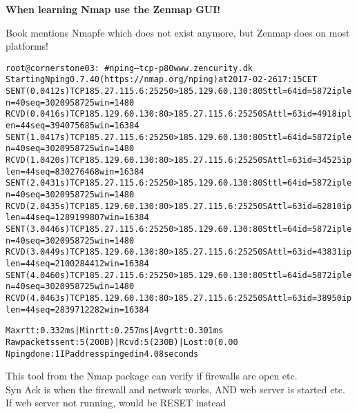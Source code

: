 \documentclass[Screen16to9,17pt]{foils}
\begin{document}
\centerline{\bf When learning Nmap use the Zenmap GUI!}

Book mentions Nmapfe which does not exist anymore, but Zenmap does on most platforms!

\begin{alltt}\footnotesize
root@cornerstone03:~# nping --tcp -p80 www.zencurity.dk
Starting Nping 0.7.40 ( https://nmap.org/nping ) at 2017-02-26 17:15 CET
SENT (0.0412s) TCP 185.27.115.6:25250 > 185.129.60.130:80 S ttl=64 id=5872 iplen=40  seq=3020958725 win=1480
RCVD (0.0416s) TCP 185.129.60.130:80 > 185.27.115.6:25250 SA ttl=63 id=4918 iplen=44  seq=394075685 win=16384
SENT (1.0417s) TCP 185.27.115.6:25250 > 185.129.60.130:80 S ttl=64 id=5872 iplen=40  seq=3020958725 win=1480
RCVD (1.0420s) TCP 185.129.60.130:80 > 185.27.115.6:25250 SA ttl=63 id=34525 iplen=44  seq=830276468 win=16384
SENT (2.0431s) TCP 185.27.115.6:25250 > 185.129.60.130:80 S ttl=64 id=5872 iplen=40  seq=3020958725 win=1480
RCVD (2.0435s) TCP 185.129.60.130:80 > 185.27.115.6:25250 SA ttl=63 id=62810 iplen=44  seq=1289199807 win=16384
SENT (3.0446s) TCP 185.27.115.6:25250 > 185.129.60.130:80 S ttl=64 id=5872 iplen=40  seq=3020958725 win=1480
RCVD (3.0449s) TCP 185.129.60.130:80 > 185.27.115.6:25250 SA ttl=63 id=43831 iplen=44  seq=2100284412 win=16384
SENT (4.0460s) TCP 185.27.115.6:25250 > 185.129.60.130:80 S ttl=64 id=5872 iplen=40  seq=3020958725 win=1480
RCVD (4.0463s) TCP 185.129.60.130:80 > 185.27.115.6:25250 SA ttl=63 id=38950 iplen=44  seq=2839712282 win=16384

Max rtt: 0.332ms | Min rtt: 0.257ms | Avg rtt: 0.301ms
Raw packets sent: 5 (200B) | Rcvd: 5 (230B) | Lost: 0 (0.00%)
Nping done: 1 IP address pinged in 4.08 seconds
\end{alltt}

This tool from the Nmap package can verify if firewalls are open etc. \\
Syn Ack is when the firewall and network works, AND web server is started etc.\\
If web server not running, would be RESET instead





\end{document}
